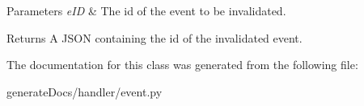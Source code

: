 \begin{DoxyParams}{Parameters}
{\em e\+ID} & The id of the event to be invalidated.\\
\hline
\end{DoxyParams}
\begin{DoxyReturn}{Returns}
A J\+S\+ON containing the id of the invalidated event. 
\end{DoxyReturn}


The documentation for this class was generated from the following file\+:\begin{DoxyCompactItemize}
\item 
generate\+Docs/handler/event.\+py\end{DoxyCompactItemize}
